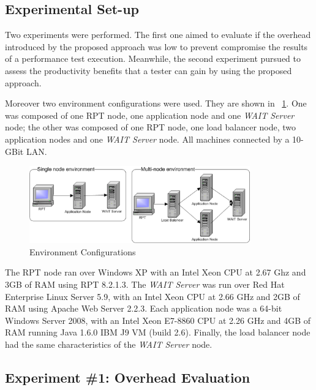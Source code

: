\documentclass[runningheads,a4paper]{llncs}
\begin{document}
\subsection{Experimental Set-up}

Two experiments were performed. The first one aimed to evaluate if the overhead
introduced by the proposed approach was low to prevent compromise the results
of a performance test execution. Meanwhile, the second experiment pursued to
assess the productivity benefits that a tester can gain by using the proposed
approach.

Moreover two environment configurations were used. They are shown in \figurename
~\ref{fig_env}. One was composed of one RPT node, one application node and one
\emph{WAIT Server} node; the other was composed of one RPT node, one load
balancer node, two application nodes and one \emph{WAIT Server} node. All
machines connected by a 10-GBit LAN.

\begin{figure}[!h]
\centering
\includegraphics[totalheight=.15\textheight,width=0.85\textwidth]{Environments}
\caption{Environment Configurations}
\label{fig_env}
\end{figure}

The RPT node ran over Windows XP with an Intel Xeon CPU at
2.67 Ghz and 3GB of RAM using RPT 8.2.1.3. The \emph{WAIT Server} was run over
Red Hat Enterprise Linux Server 5.9, with an Intel Xeon CPU at 2.66 GHz and 2GB of
RAM using Apache Web Server 2.2.3. Each application node was a 64-bit Windows
Server 2008, with an Intel Xeon E7-8860 CPU at 2.26 GHz and 4GB of RAM
running Java 1.6.0 IBM J9 VM (build 2.6). Finally, the load balancer node had
the same characteristics of the \emph{WAIT Server} node. 

\vspace{-5pt}
\subsection{Experiment \#1: Overhead Evaluation}
\vspace{-2pt}
\end{document}
